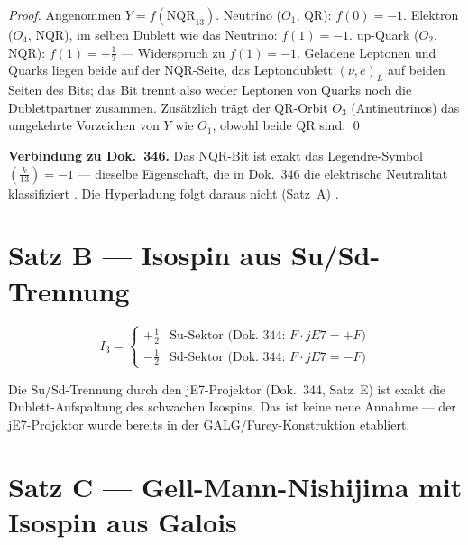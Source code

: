 \begin{proof}
Angenommen $Y = f(\mathrm{NQR}_{13})$.
Neutrino ($O_1$, QR): $f(0) = -1$.
Elektron ($O_4$, NQR), im selben Dublett wie das Neutrino: $f(1) = -1$.
up-Quark ($O_2$, NQR): $f(1) = +\tfrac{1}{3}$ --- Widerspruch zu $f(1)=-1$.
Geladene Leptonen und Quarks liegen beide auf der NQR-Seite, das Leptondublett
$(\nu,e)_L$ auf beiden Seiten des Bits; das Bit trennt also weder Leptonen von
Quarks noch die Dublettpartner zusammen. Zusätzlich trägt der QR-Orbit $O_3$
(Antineutrinos) das umgekehrte Vorzeichen von $Y$ wie $O_1$, obwohl beide QR sind. \qed
\end{proof}

\textbf{Verbindung zu Dok.~346.} Das NQR-Bit ist exakt das Legendre-Symbol
$\left(\tfrac{k}{13}\right) = -1$ --- dieselbe Eigenschaft, die in Dok.~346 die
elektrische Neutralität klassifiziert \BM. Die Hyperladung folgt daraus nicht (Satz~A) \SM.

\section{Satz B --- Isospin aus Su/Sd-Trennung}

\begin{theorem}
\[
  I_3 = \begin{cases}
    +\tfrac{1}{2} & \text{Su-Sektor (Dok.~344: }F \cdot jE7 = +F\text{)}\\
    -\tfrac{1}{2} & \text{Sd-Sektor (Dok.~344: }F \cdot jE7 = -F\text{)}
  \end{cases}
\]
\end{theorem}

Die Su/Sd-Trennung durch den jE7-Projektor (Dok.~344, Satz~E) ist exakt die
Dublett-Aufspaltung des schwachen Isospins. Das ist keine neue Annahme ---
der jE7-Projektor wurde bereits in der GALG/Furey-Konstruktion etabliert.

\section{Satz C --- Gell-Mann-Nishijima mit Isospin aus Galois}

